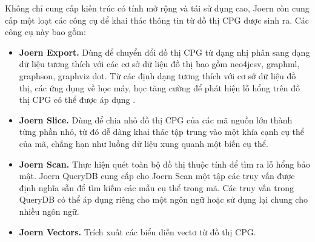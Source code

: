 Không chỉ cung cấp kiến trúc có tính mở rộng và tái sử dụng cao, Joern còn cung cấp một loạt các công cụ để khai thác thông tin từ đồ thị CPG được sinh ra.
Các công cụ này bao gồm:

\begin{itemize}
  \item \textbf{Joern Export.} Dùng để chuyển đổi đồ thị CPG từ dạng nhị phân sang dạng dữ liệu tương thích với các cơ sở dữ liệu đồ thị bao gồm neo4jcsv, graphml, graphson, graphviz dot.
  Từ các định dạng tương thích với cơ sở dữ liệu đồ thị, các ứng dụng về học máy, học tăng cường để phát hiện lỗ hổng trên đồ thị CPG có thể được áp dụng \cite{zhou2019devign, alsulami2017source, li2016vulpecker, dauber2018git, machiry2020spider}.
  \item \textbf{Joern Slice.} Dùng để chia nhỏ đồ thị CPG của các mã nguồn lớn thành từng phần nhỏ, từ đó dễ dàng khai thác tập trung vào một khía cạnh cụ thể của mã, chẳng hạn như luồng dữ liệu xung quanh một biến cụ thể.
  \item \textbf{Joern Scan.} Thực hiện quét toàn bộ đồ thị thuộc tính để tìm ra lỗ hổng bảo mật.
  Joern QueryDB \cite{joernJoernQuery} cung cấp cho Joern Scan một tập các truy vấn được định nghĩa sẵn để tìm kiếm các mẫu cụ thể trong mã.
  Các truy vấn trong QueryDB có thể áp dụng riêng cho một ngôn ngữ hoặc sử dụng lại chung cho nhiều ngôn ngữ.
  \item \textbf{Joern Vectors.} Trích xuất các biểu diễn vectơ từ đồ thị CPG.
\end{itemize}
